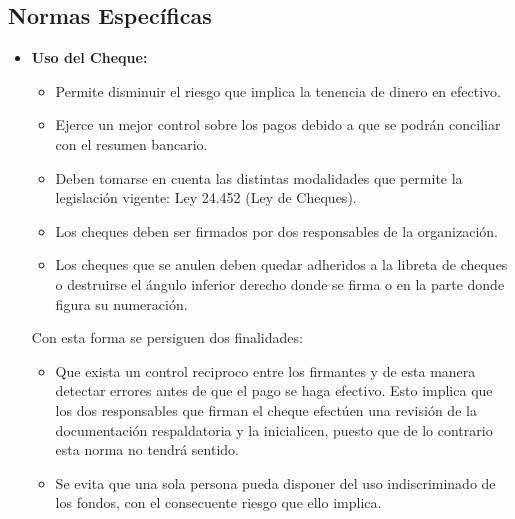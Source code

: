 \subsection{Normas Específicas}
\begin{itemize}
  \item \textbf{Uso del Cheque:}
  \begin{itemize}
    \item Permite disminuir el riesgo que implica la tenencia de dinero en efectivo.
    \item Ejerce un mejor control sobre los pagos debido a que se podrán conciliar con el resumen bancario.
    \item Deben tomarse en cuenta las distintas modalidades que permite la legislación vigente: Ley 24.452 (Ley de Cheques).
    \item Los cheques deben ser firmados por dos responsables de la organización.
    \item Los cheques que se anulen deben quedar adheridos a la libreta de cheques o destruirse el ángulo inferior derecho donde se firma o en la parte donde figura su numeración.
  \end{itemize}


Con esta forma se persiguen dos finalidades:
  \begin{itemize}
    \item Que exista un control reciproco entre los firmantes y de esta manera detectar errores antes de que el pago se haga efectivo. Esto implica que los dos responsables que firman el cheque efectúen una revisión de la documentación respaldatoria y la inicialicen, puesto que de lo contrario esta norma no tendrá sentido.
    \item Se evita que una sola persona pueda disponer del uso indiscriminado de los fondos, con el consecuente riesgo que ello implica.
  \end{itemize}


\end{itemize}
